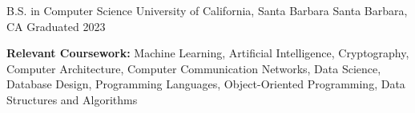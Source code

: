 \documentclass[12pt, letterpaper]{russell}
\begin{document}
\makecvheader

\vspace{-.6cm}


\begin{cventries}

  \cventry
    {B.S. in Computer Science} %
    {University of California, Santa Barbara} %
    {Santa Barbara, CA} %
    {Graduated 2023} %
    {
      \begin{cvitems} %
        \item {\textbf{Relevant Coursework:} Machine Learning, Artificial Intelligence, Cryptography, Computer Architecture, Computer Communication Networks, Data Science, Database Design, Programming Languages, Object-Oriented Programming, Data Structures and Algorithms}
      \end{cvitems}
    }

\end{cventries}

\vspace{-0.3cm}


\vspace{-0.3cm}
\end{document}
